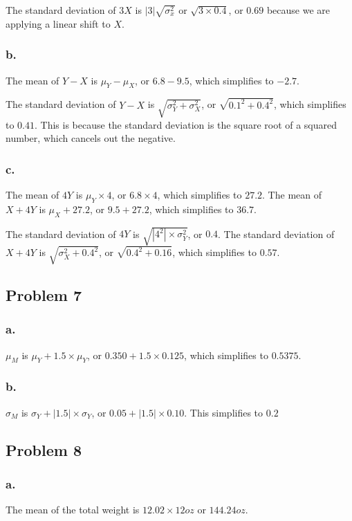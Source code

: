 \documentclass[11pt]{article}
\begin{document}
The standard deviation of $3X$ is $|3|\sqrt{\sigma_x^2}$ or $\sqrt{3\times
0.4}$, or $0.69$
because we are applying a linear shift to $X$. 

\subsubsection*{b.}
The mean of $Y - X$ is $\mu_Y - \mu_X$, or $6.8 - 9.5$, which simplifies to
$-2.7$. 

The standard deviation of $Y - X$ is $\sqrt{\sigma_Y^2 + \sigma_X^2}$, or
$\sqrt{0.1^2+0.4^2}$, which
simplifies to $0.41$. This is because the standard deviation is the square root
of a squared number, which cancels out the negative. 

\subsubsection*{c.}
The mean of $4Y$ is $\mu_Y\times 4$, or $6.8 \times 4$, which simplifies to
$27.2$. The mean of $X + 4Y$ is $\mu_X + 27.2$, or $9.5 + 27.2$, which
simplifies to $36.7$. 

The standard deviation of $4Y$ is $\sqrt{|4^2|\times \sigma_Y^2}$, or $0.4$. The standard
deviation of $X + 4Y$ is $\sqrt{\sigma_X^2 + 0.4^2}$, or $\sqrt{0.4^2+0.16}$, which simplifies to
$0.57$. 

\subsection*{Problem 7}
\subsubsection*{a.}
$\mu_M$ is $\mu_Y+1.5\times \mu_Y$, or $0.350 + 1.5\times 0.125$, which
simplifies to $0.5375$.

\subsubsection*{b.}
$\sigma_M$ is $\sigma_Y+|1.5|\times \sigma_Y$, or $0.05+|1.5|\times 0.10$. This
simplifies to $0.2$

\subsection*{Problem 8}
\subsubsection*{a.}
The mean of the total weight is $12.02 \times 12 oz$ or $144.24 oz$.
\end{document}
